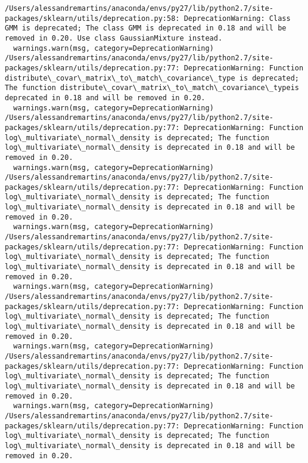 \documentclass[11pt]{article}
\begin{document}
    \begin{Verbatim}[commandchars=\\\{\}]
/Users/alessandremartins/anaconda/envs/py27/lib/python2.7/site-packages/sklearn/utils/deprecation.py:58: DeprecationWarning: Class GMM is deprecated; The class GMM is deprecated in 0.18 and will be  removed in 0.20. Use class GaussianMixture instead.
  warnings.warn(msg, category=DeprecationWarning)
/Users/alessandremartins/anaconda/envs/py27/lib/python2.7/site-packages/sklearn/utils/deprecation.py:77: DeprecationWarning: Function distribute\_covar\_matrix\_to\_match\_covariance\_type is deprecated; The function distribute\_covar\_matrix\_to\_match\_covariance\_typeis deprecated in 0.18 and will be removed in 0.20.
  warnings.warn(msg, category=DeprecationWarning)
/Users/alessandremartins/anaconda/envs/py27/lib/python2.7/site-packages/sklearn/utils/deprecation.py:77: DeprecationWarning: Function log\_multivariate\_normal\_density is deprecated; The function log\_multivariate\_normal\_density is deprecated in 0.18 and will be removed in 0.20.
  warnings.warn(msg, category=DeprecationWarning)
/Users/alessandremartins/anaconda/envs/py27/lib/python2.7/site-packages/sklearn/utils/deprecation.py:77: DeprecationWarning: Function log\_multivariate\_normal\_density is deprecated; The function log\_multivariate\_normal\_density is deprecated in 0.18 and will be removed in 0.20.
  warnings.warn(msg, category=DeprecationWarning)
/Users/alessandremartins/anaconda/envs/py27/lib/python2.7/site-packages/sklearn/utils/deprecation.py:77: DeprecationWarning: Function log\_multivariate\_normal\_density is deprecated; The function log\_multivariate\_normal\_density is deprecated in 0.18 and will be removed in 0.20.
  warnings.warn(msg, category=DeprecationWarning)
/Users/alessandremartins/anaconda/envs/py27/lib/python2.7/site-packages/sklearn/utils/deprecation.py:77: DeprecationWarning: Function log\_multivariate\_normal\_density is deprecated; The function log\_multivariate\_normal\_density is deprecated in 0.18 and will be removed in 0.20.
  warnings.warn(msg, category=DeprecationWarning)
/Users/alessandremartins/anaconda/envs/py27/lib/python2.7/site-packages/sklearn/utils/deprecation.py:77: DeprecationWarning: Function log\_multivariate\_normal\_density is deprecated; The function log\_multivariate\_normal\_density is deprecated in 0.18 and will be removed in 0.20.
  warnings.warn(msg, category=DeprecationWarning)
/Users/alessandremartins/anaconda/envs/py27/lib/python2.7/site-packages/sklearn/utils/deprecation.py:77: DeprecationWarning: Function log\_multivariate\_normal\_density is deprecated; The function log\_multivariate\_normal\_density is deprecated in 0.18 and will be removed in 0.20.

\end{Verbatim}
\end{document}
